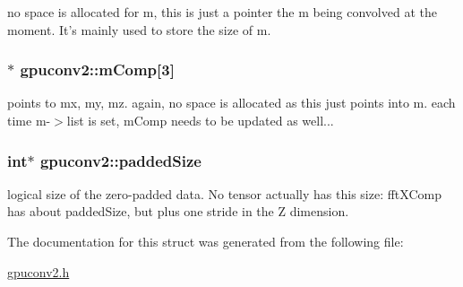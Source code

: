 no space is allocated for m, this is just a pointer the m being convolved at the moment. It's mainly used to store the size of m. 

\hypertarget{structgpuconv2_acdabd23ef571842ec90007196a2e0d17}{
\subsubsection[{mComp}]{$\ast$ {\bf gpuconv2::mComp}\mbox{[}3\mbox{]}}}
\label{structgpuconv2_acdabd23ef571842ec90007196a2e0d17}


points to mx, my, mz. again, no space is allocated as this just points into m. each time m-\/$>$list is set, mComp needs to be updated as well... 

\hypertarget{structgpuconv2_aebc50066934a168c5a1a90f550bd7a84}{
\subsubsection[{paddedSize}]{\setlength{\rightskip}{0pt plus 5cm}int$\ast$ {\bf gpuconv2::paddedSize}}}
\label{structgpuconv2_aebc50066934a168c5a1a90f550bd7a84}


logical size of the zero-\/padded data. No tensor actually has this size: fftXComp has about paddedSize, but plus one stride in the Z dimension. 



The documentation for this struct was generated from the following file:\begin{DoxyCompactItemize}
\item 
\hyperlink{gpuconv2_8h}{gpuconv2.h}\end{DoxyCompactItemize}
